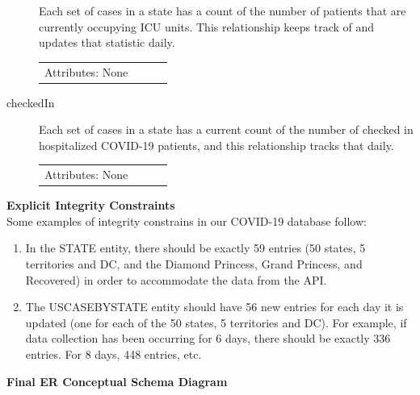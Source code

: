 \documentclass[11pt]{article}
\begin{document}
\begin{description}
\noindent
Each set of cases in a state has a count of the number of patients that are currently occupying ICU units. This relationship keeps track of and updates that statistic daily.

\begin{tabular}{lllc}
    Attributes: None \\
\end{tabular}

\item [checkedIn]

\noindent
Each set of cases in a state has a current count of the number of checked in hospitalized COVID-19 patients, and this relationship tracks that daily.

\begin{tabular}{lllc}
    Attributes: None \\
\end{tabular}

\end{description}

\noindent
\textbf{Explicit Integrity Constraints} \\

\noindent
Some examples of integrity constrains in our COVID-19 database follow:

\begin{enumerate}
    \item In the STATE entity, there should be exactly 59 entries (50 states, 5 territories and DC, and the Diamond Princess, Grand Princess, and Recovered) in order to accommodate the data from the API.
    \item The USCASEBYSTATE entity should have 56 new entries for each day it is updated (one for each of the 50 states, 5 territories and DC). For example, if data collection has been occurring for 6 days, there should be exactly 336 entries. For 8 days, 448 entries, etc.
\end{enumerate}

\pagebreak

\noindent
\textbf{Final ER Conceptual Schema Diagram}
\end{document}
